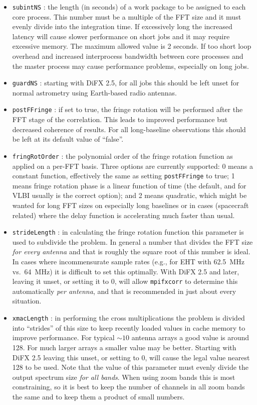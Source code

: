 \documentclass[12pt]{article}
\begin{document}
\begin{itemize}
\item {\tt subintNS} : the length (in seconds) of a work package to be assigned to each core process.
This number must be a multiple of the FFT size and it must evenly divide into the integration time.
If excessively long the increased latency will cause slower performance on short jobs and it may require excessive memory.  The maximum allowed value is 2 seconds.  If too short loop overhead and increased interprocess bandwidth between core processes and the master process may cause performance problems, especially on long jobs.
\item {\tt guardNS} : starting with DiFX 2.5, for all jobs this should be left unset for normal astrometry using Earth-based radio antennas.
\item {\tt postFFringe} : if set to true, the fringe rotation will be performed after the FFT stage of the correlation.
This leads to improved performance but decreased coherence of results. 
For all long-baseline observations this should be left at its default value of ``false''.
\item {\tt fringRotOrder} : the polynomial order of the fringe rotation function as applied on a per-FFT basis.
Three options are currently supported: 0 means a constant function, effectively the same as setting {\tt postFFringe} to true; 1 means fringe rotation phase is a linear function of time (the default, and for VLBI usually is the correct option); and 2 means quadratic, which might be wanted for long FFT sizes on especially long baselines or in cases (spacecraft related) where the delay function is accelerating much faster than usual.
\item {\tt strideLength} : in calculating the fringe rotation function this parameter is used to subdivide the problem.
In general a number that divides the FFT size {\em for every antenna} and that is roughly the square root of this number is ideal.
In cases where incommensurate sample rates (e.g., for EHT with 62.5~MHz vs.\ 64~MHz) it is difficult to set this optimally.
With DiFX 2.5 and later, leaving it unset, or setting it to 0, will allow {\tt mpifxcorr} to determine this automatically {\em per antenna}, and that is recommended in just about every situation.
\item {\tt xmacLength} : in performing the cross multiplications the problem is divided into ``strides'' of this size to keep recently loaded values in cache memory to improve performance.
For typical $\sim 10$ antenna arrays a good value is around 128.
For much larger arrays a smaller value may be better.
Starting with DiFX 2.5 leaving this unset, or setting to 0, will cause the legal value nearest 128 to be used.
Note that the value of this parameter must evenly divide the output spectrum size {\em for all bands}.
When using zoom bands this is most constraining, so it is best to keep the number of channels in all zoom bands the same and to keep them a product of small numbers.

\end{itemize}
\end{document}
